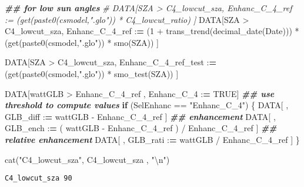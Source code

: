 \documentclass[
  10pt,
  a4paper,oneside]{article}
\newenvironment{Shaded}{\begin{snugshade}}{\end{snugshade}}
\newcommand{\CommentTok}[1]{\textcolor[rgb]{0.56,0.35,0.01}{\textit{#1}}}
\newcommand{\ConstantTok}[1]{\textcolor[rgb]{0.00,0.00,0.00}{#1}}
\newcommand{\ControlFlowTok}[1]{\textcolor[rgb]{0.13,0.29,0.53}{\textbf{#1}}}
\newcommand{\DecValTok}[1]{\textcolor[rgb]{0.00,0.00,0.81}{#1}}
\newcommand{\DocumentationTok}[1]{\textcolor[rgb]{0.56,0.35,0.01}{\textbf{\textit{#1}}}}
\newcommand{\ErrorTok}[1]{\textcolor[rgb]{0.64,0.00,0.00}{\textbf{#1}}}
\newcommand{\FunctionTok}[1]{\textcolor[rgb]{0.00,0.00,0.00}{#1}}
\newcommand{\NormalTok}[1]{#1}
\newcommand{\SpecialCharTok}[1]{\textcolor[rgb]{0.00,0.00,0.00}{#1}}
\newcommand{\StringTok}[1]{\textcolor[rgb]{0.31,0.60,0.02}{#1}}
\begin{document}
\begin{Shaded}
\begin{Highlighting}[]
\DocumentationTok{\#\# for low sun angles}
\CommentTok{\# DATA[SZA \textgreater{} C4\_lowcut\_sza, Enhanc\_C\_4\_ref := (get(paste0(csmodel,".glo")) * C4\_lowcut\_ratio) ]}
\NormalTok{DATA[SZA }\SpecialCharTok{\textgreater{}}\NormalTok{ C4\_lowcut\_sza,}
\NormalTok{     Enhanc\_C\_4\_ref }\SpecialCharTok{:}\ErrorTok{=}\NormalTok{ (}\DecValTok{1} \SpecialCharTok{+} \FunctionTok{trans\_trend}\NormalTok{(}\FunctionTok{decimal\_date}\NormalTok{(Date))) }\SpecialCharTok{*}\NormalTok{ (}\FunctionTok{get}\NormalTok{(}\FunctionTok{paste0}\NormalTok{(csmodel,}\StringTok{".glo"}\NormalTok{)) }\SpecialCharTok{*} \FunctionTok{smo}\NormalTok{(SZA)) ]}

\NormalTok{DATA[SZA }\SpecialCharTok{\textgreater{}}\NormalTok{ C4\_lowcut\_sza,}
\NormalTok{     Enhanc\_C\_4\_ref\_test }\SpecialCharTok{:}\ErrorTok{=}\NormalTok{                                    (}\FunctionTok{get}\NormalTok{(}\FunctionTok{paste0}\NormalTok{(csmodel,}\StringTok{".glo"}\NormalTok{)) }\SpecialCharTok{*} \FunctionTok{smo\_test}\NormalTok{(SZA)) ]}



\NormalTok{DATA[wattGLB }\SpecialCharTok{\textgreater{}}\NormalTok{ Enhanc\_C\_4\_ref ,}
\NormalTok{     Enhanc\_C\_4 }\SpecialCharTok{:}\ErrorTok{=} \ConstantTok{TRUE}\NormalTok{]}
\DocumentationTok{\#\# use threshold to compute values}
\ControlFlowTok{if}\NormalTok{ (SelEnhanc }\SpecialCharTok{==} \StringTok{"Enhanc\_C\_4"}\NormalTok{) \{}
\NormalTok{  DATA[ , GLB\_diff }\SpecialCharTok{:}\ErrorTok{=}\NormalTok{   wattGLB }\SpecialCharTok{{-}}\NormalTok{ Enhanc\_C\_4\_ref                    ] }\DocumentationTok{\#\# enhancement}
\NormalTok{  DATA[ , GLB\_ench }\SpecialCharTok{:}\ErrorTok{=}\NormalTok{ ( wattGLB }\SpecialCharTok{{-}}\NormalTok{ Enhanc\_C\_4\_ref ) }\SpecialCharTok{/}\NormalTok{ Enhanc\_C\_4\_ref ] }\DocumentationTok{\#\# relative enhancement}
\NormalTok{  DATA[ , GLB\_rati }\SpecialCharTok{:}\ErrorTok{=}\NormalTok{   wattGLB }\SpecialCharTok{/}\NormalTok{ Enhanc\_C\_4\_ref                    ]}
\NormalTok{\}}

\FunctionTok{cat}\NormalTok{(}\StringTok{"C4\_lowcut\_sza"}\NormalTok{,      C4\_lowcut\_sza    , }\StringTok{"}\SpecialCharTok{\textbackslash{}n}\StringTok{"}\NormalTok{)}
\end{Highlighting}
\end{Shaded}

\begin{verbatim}
C4_lowcut_sza 90 
\end{verbatim}
\end{document}
